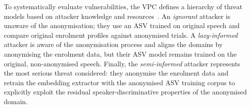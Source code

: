 To systematically evaluate vulnerabilities, the VPC defines a hierarchy of threat models based on attacker knowledge and resources~\cite{tomashenko2024voiceprivacy}. An \textit{ignorant} attacker is unaware of the anonymisation; they use an ASV trained on original speech and compare original enrolment profiles against anonymised trials. A \textit{lazy-informed} attacker is aware of the anonymisation process and aligns the domains by anonymising the enrolment data, but their ASV model remains trained on the original, non-anonymised speech. Finally, the \textit{semi-informed} attacker represents the most serious threat considered: they anonymise the enrolment data and retrain the embedding extractor with the anonymised ASV training corpus to explicitly exploit the residual speaker-discriminative properties of the anonymised domain.

